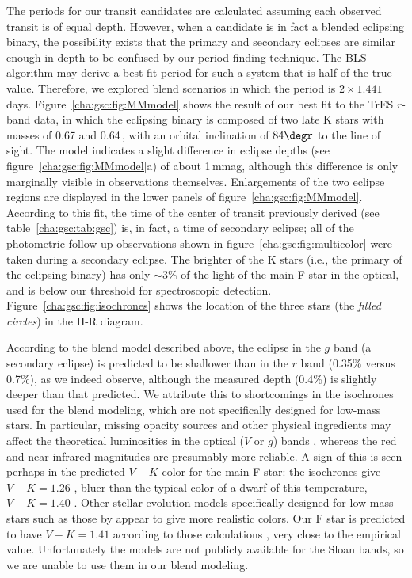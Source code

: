 The periods for our transit candidates are calculated assuming each
observed transit is of equal depth. However, when a candidate is in
fact a blended eclipsing binary, the possibility exists that the
primary and secondary eclipses are similar enough in depth to be
confused by our period-finding technique. The BLS algorithm may derive
a best-fit period for such a system that is half of the true value.
Therefore, we explored blend scenarios in which the period is $2
\times 1.441$ days. Figure~\ref{cha:gsc:fig:MMmodel} shows the result of our
best fit to the TrES $r$-band data, in which the eclipsing binary is
composed of two late K stars with masses of 0.67 and
0.64\,\msun, with an orbital inclination of $84\degr$ to the
line of sight.  The model indicates a slight difference in eclipse
depths (see figure~\ref{cha:gsc:fig:MMmodel}a) of about 1\,mmag, although this
difference is only marginally visible in observations themselves.
Enlargements of the two eclipse regions are displayed in the lower
panels of figure~\ref{cha:gsc:fig:MMmodel}.  According to this fit, the time
of the center of transit previously derived (see table~\ref{cha:gsc:tab:gsc})
is, in fact, a time of secondary eclipse; all of the photometric
follow-up observations shown in figure~\ref{cha:gsc:fig:multicolor} were taken
during a secondary eclipse.  The brighter of the K stars (i.e., the
primary of the eclipsing binary) has only $\sim$3\% of the light of
the main F star in the optical, and is below our threshold for
spectroscopic detection.  Figure~\ref{cha:gsc:fig:isochrones} shows the
location of the three stars (the {\it filled circles}) in the H-R diagram.

According to the blend model described above, the eclipse in the $g$
band (a secondary eclipse) is predicted to be shallower than in the
$r$ band (0.35\% versus 0.7\%), as we indeed observe, although the
measured depth (0.4\%) is slightly deeper than that predicted. We attribute
this to shortcomings in the isochrones used for the blend modeling,
which are not specifically designed for low-mass stars. In particular,
missing opacity sources and other physical ingredients may affect the
theoretical luminosities in the optical ($V$ or $g$) bands
\citep{Baraffe_Chabrier_Allard:aa:1998a,
  Delfosse_Forveille_Segransan:aa:2000a,
  Chabrier_Baraffe_Allard:asp:2005a}, whereas the red and near-infrared magnitudes are presumably more reliable. A sign of this is
seen perhaps in the predicted $V-K$ color for the main F star: the
isochrones give $V-K = 1.26$ \citep[in the Johnson system as defined
by][]{Bessell_Brett:pasp:1988a}, bluer than the typical color of a
dwarf of this temperature, $V-K = 1.40$
\citep[e.g.,][]{Bessell_Brett:pasp:1988a}.  Other stellar evolution
models specifically designed for low-mass stars such as those by
\citet{Baraffe_Chabrier_Allard:aa:1998a} appear to give more realistic
colors. Our F star is predicted to have $V-K = 1.41$ according to
those calculations \citep[after transformation of the isochrone $K$
magnitudes from the CIT to the Johnson system,
following][]{Leggett:apjs:1992}, very close to the empirical
value. Unfortunately the \citet{Baraffe_Chabrier_Allard:aa:1998a}
models are not publicly available for the Sloan bands, so we are
unable to use them in our blend modeling.

